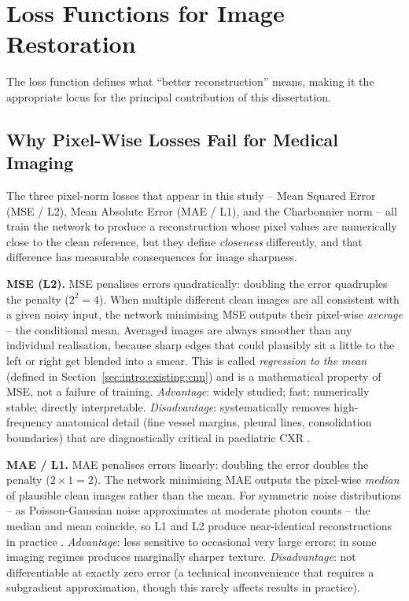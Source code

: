 \documentclass[12pt, a4paper, twoside, openright]{book}
\begin{document}
\section{Loss Functions for Image Restoration}
\label{sec:lit:losses}

The loss function defines what ``better reconstruction'' means, making it the appropriate locus for the principal contribution of this dissertation.

\subsection{Why Pixel-Wise Losses Fail for Medical Imaging}
\label{sec:lit:losses:pixelwise}

The three pixel-norm losses that appear in this study -- Mean Squared Error (MSE / L2), Mean Absolute Error (MAE / L1), and the Charbonnier norm -- all train the network to produce a reconstruction whose pixel values are numerically close to the clean reference, but they define \emph{closeness} differently, and that difference has measurable consequences for image sharpness.

\textbf{MSE (L2).} MSE penalises errors quadratically: doubling the error quadruples the penalty ($2^2 = 4$). When multiple different clean images are all consistent with a given noisy input, the network minimising MSE outputs their pixel-wise \emph{average} -- the conditional mean. Averaged images are always smoother than any individual realisation, because sharp edges that could plausibly sit a little to the left or right get blended into a smear. This is called \emph{regression to the mean} (defined in Section~\ref{sec:intro:existing:cnn}) and is a mathematical property of MSE, not a failure of training. \emph{Advantage}: widely studied; fast; numerically stable; directly interpretable. \emph{Disadvantage}: systematically removes high-frequency anatomical detail (fine vessel margins, pleural lines, consolidation boundaries) that are diagnostically critical in paediatric CXR \cite{zhao_loss_2017}.

\textbf{MAE / L1.} MAE penalises errors linearly: doubling the error doubles the penalty ($2 \times 1 = 2$). The network minimising MAE outputs the pixel-wise \emph{median} of plausible clean images rather than the mean. For symmetric noise distributions -- as Poisson-Gaussian noise approximates at moderate photon counts -- the median and mean coincide, so L1 and L2 produce near-identical reconstructions in practice \cite{zhao_loss_2017}. \emph{Advantage}: less sensitive to occasional very large errors; in some imaging regimes produces marginally sharper texture. \emph{Disadvantage}: not differentiable at exactly zero error (a technical inconvenience that requires a subgradient approximation, though this rarely affects results in practice).
\end{document}
